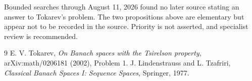 \documentclass[11pt]{article}
\begin{document}
Bounded searches through August 11, 2026 found no later source stating an
answer to Tokarev's problem.  The two propositions above are elementary but
appear not to be recorded in the source.  Priority is not asserted, and
specialist review is recommended.

\begin{thebibliography}{9}
E. V. Tokarev,
\emph{On Banach spaces with the Tsirelson property}, arXiv:math/0206181
(2002), Problem 1.
J. Lindenstrauss and L. Tzafriri,
\emph{Classical Banach Spaces I: Sequence Spaces}, Springer, 1977.
\end{thebibliography}
\end{document}
